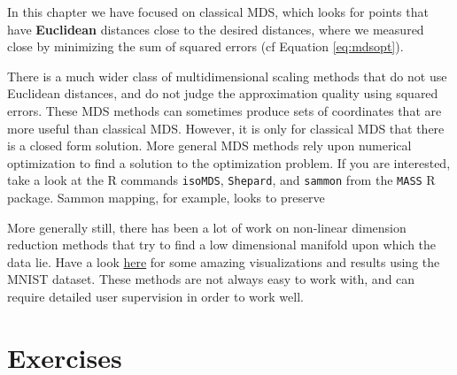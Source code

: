 \documentclass[]{book}
\theoremstyle{definition}
\theoremstyle{definition}
\theoremstyle{definition}
\theoremstyle{remark}
\begin{document}
In this chapter we have focused on classical MDS, which looks for points that have \textbf{Euclidean} distances close to the desired distances, where we measured close by minimizing the sum of squared errors (cf Equation \eqref{eq:mdsopt}).

There is a much wider class of multidimensional scaling methods that do not use Euclidean distances, and do not judge the approximation quality using squared errors. These MDS methods can sometimes produce sets of coordinates that are more useful than classical MDS. However, it is only for classical MDS that there is a closed form solution. More general MDS methods rely upon numerical optimization to find a solution to the optimization problem. If you are interested, take a look at the R commands \texttt{isoMDS}, \texttt{Shepard}, and \texttt{sammon} from the \texttt{MASS} R package. Sammon mapping, for example, looks to preserve

More generally still, there has been a lot of work on non-linear dimension reduction methods that try to find a low dimensional manifold upon which the data lie. Have a look \href{https://colah.github.io/posts/2014-10-Visualizing-MNIST/}{here} for some amazing visualizations and results using the MNIST dataset. These methods are not always easy to work with, and can require detailed user supervision in order to work well.

\hypertarget{exercises-3}{%
\section{Exercises}\label{exercises-3}}
\end{document}
